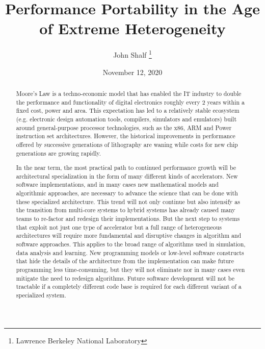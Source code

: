 \documentclass{article}
\title{Performance Portability in the Age of Extreme Heterogeneity}
\author{John Shalf \thanks{Lawrence Berkeley National Laboratory }}
\date{November 12, 2020}
\begin{document}
\maketitle

\begin{abstract}
Moore’s Law is a techno-economic model that has enabled the IT industry to double the performance and functionality of digital electronics roughly every 2 years within a fixed cost, power and area. This expectation has led to a relatively stable ecosystem (e.g. electronic design automation tools, compilers, simulators and emulators) built around general-purpose processor technologies, such as the x86, ARM and Power instruction set architectures. However, the historical improvements in performance offered by successive generations of lithography are waning while costs for new chip generations are growing rapidly.

In the near term, the most practical path to continued performance growth will be architectural specialization in the form of many different kinds of accelerators. New software implementations, and in many cases new mathematical models and algorithmic approaches, are necessary to advance the science that can be done with these specialized architecture. This trend will not only continue but also intensify as the transition from multi-core systems to hybrid systems has already caused many teams to re-factor and redesign their implementations. But the next step to systems that exploit not just one type of accelerator but a full range of heterogeneous architectures will require more fundamental and disruptive changes in algorithm and software approaches. This applies to the broad range of algorithms used in simulation, data analysis and learning. New programming models or low-level software constructs that hide the details of the architecture from the implementation can make future programming less time-consuming, but they will not eliminate nor in many cases even mitigate the need to redesign algorithms.  Future software development will not be tractable if a completely different code base is required for each different variant of a specialized system.


\end{abstract}
\end{document}
